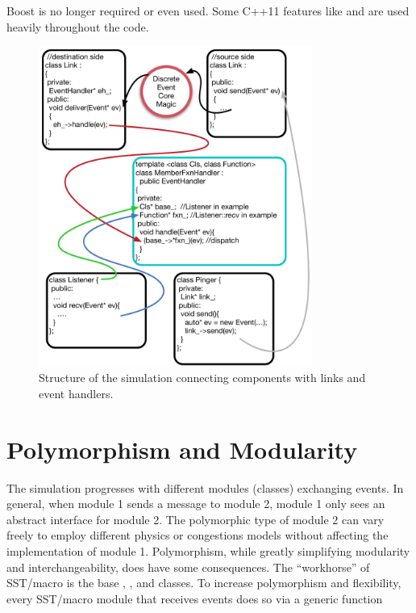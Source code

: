 Boost is no longer required or even used.
Some C++11 features like  and  are used heavily throughout the code.

\begin{figure}
\centering
\includegraphics[width=0.8\textwidth]{figures/EventHandler}
\caption{Structure of the simulation connecting components with links and event handlers.}
\label{fig:abstractHandlers}
\end{figure}

\section{Polymorphism and Modularity}\label{sec:polymorphism}
The simulation progresses with different modules (classes) exchanging events.
In general, when module 1 sends a message to module 2, module 1 only sees an abstract interface for module 2.
The polymorphic type of module 2 can vary freely to employ different physics or congestions models without affecting the implementation of module 1. 
Polymorphism, while greatly simplifying modularity and interchangeability, does have some consequences.
The ``workhorse'' of SST/macro is the base , , and  classes.
To increase polymorphism and flexibility, every SST/macro module that receives events does so via a generic function

